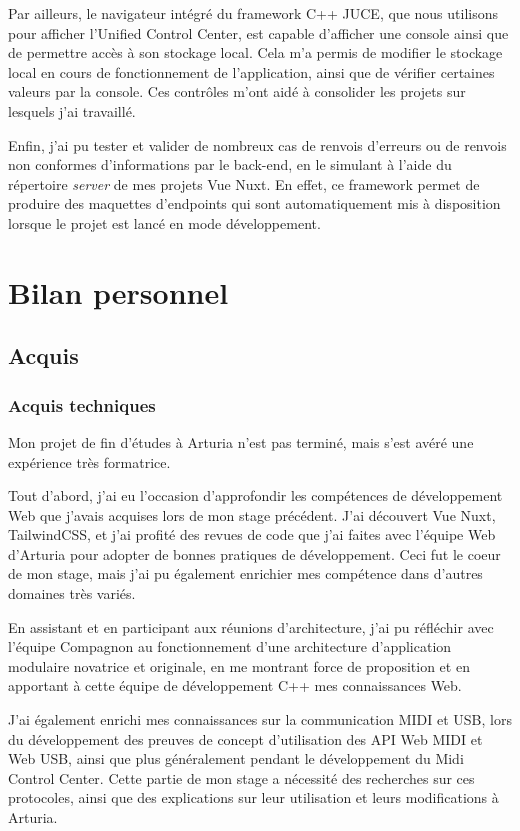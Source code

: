 \documentclass[francais]{rapportPFE}  %
\begin{document}
Par ailleurs, le navigateur intégré du framework C++ JUCE, que nous utilisons pour afficher l'Unified Control Center, est capable d'afficher une console ainsi que de permettre accès à son stockage local. Cela m'a permis de modifier le stockage local en cours de fonctionnement de l'application, ainsi que de vérifier certaines valeurs par la console. Ces contrôles m'ont aidé à consolider les projets sur lesquels j'ai travaillé.

Enfin, j'ai pu tester et valider de nombreux cas de renvois d'erreurs ou de renvois non conformes d'informations par le back-end, en le simulant à l'aide du répertoire \textit{server} de mes projets Vue Nuxt. En effet, ce framework permet de produire des maquettes d'endpoints qui sont automatiquement mis à disposition lorsque le projet est lancé en mode développement.

\section{Bilan personnel}
\subsection{Acquis}
\subsubsection{Acquis techniques}

Mon projet de fin d'études à Arturia n'est pas terminé, mais s'est avéré une expérience très formatrice. 

Tout d'abord, j'ai eu l'occasion d'approfondir les compétences de développement Web que j'avais acquises lors de mon stage précédent. J'ai découvert Vue Nuxt, TailwindCSS, et j'ai profité des revues de code que j'ai faites avec l'équipe Web d'Arturia pour adopter de bonnes pratiques de développement. Ceci fut le coeur de mon stage, mais j'ai pu également enrichier mes compétence dans d'autres domaines très variés. 

En assistant et en participant aux réunions d'architecture, j'ai pu réfléchir avec l'équipe Compagnon au fonctionnement d'une architecture d'application modulaire novatrice et originale, en me montrant force de proposition et en apportant à cette équipe de développement C++ mes connaissances Web. 

J'ai également enrichi mes connaissances sur la communication MIDI et USB, lors du développement des preuves de concept d'utilisation des API Web MIDI et Web USB, ainsi que plus généralement pendant le développement du Midi Control Center. Cette partie de mon stage a nécessité des recherches sur ces protocoles, ainsi que des explications sur leur utilisation et leurs modifications à Arturia. 
\end{document}
